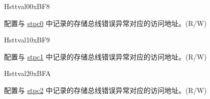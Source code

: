 \begin{register}{H}{sttval0}{0xBF8}\label{regdesc:STTVAL0}%
%
\regnewline%
\begin{regdesc}\begin{reglist}
\label{fielddesc:STTVAL0_ADDR}\item [ADDR] 配置与 \hyperref[regdesc:STPC0]{stpc0} 中记录的存储总线错误异常对应的访问地址。(R/W)
\end{reglist}\end{regdesc}
\end{register}

\begin{register}{H}{sttval1}{0xBF9}\label{regdesc:STTVAL1}%
%
\regnewline%
\begin{regdesc}\begin{reglist}
\label{fielddesc:STTVAL1_ADDR}\item [ADDR] 配置与 \hyperref[regdesc:STPC1]{stpc1} 中记录的存储总线错误异常对应的访问地址。(R/W)
\end{reglist}\end{regdesc}
\end{register}

\begin{register}{H}{sttval2}{0xBFA}\label{regdesc:STTVAL2}%
%
\regnewline%
\begin{regdesc}\begin{reglist}
\label{fielddesc:STTVAL2_ADDR}\item [ADDR] 配置与 \hyperref[regdesc:STPC2]{stpc2} 中记录的存储总线错误异常对应的访问地址。(R/W)
\end{reglist}\end{regdesc}
\end{register}
